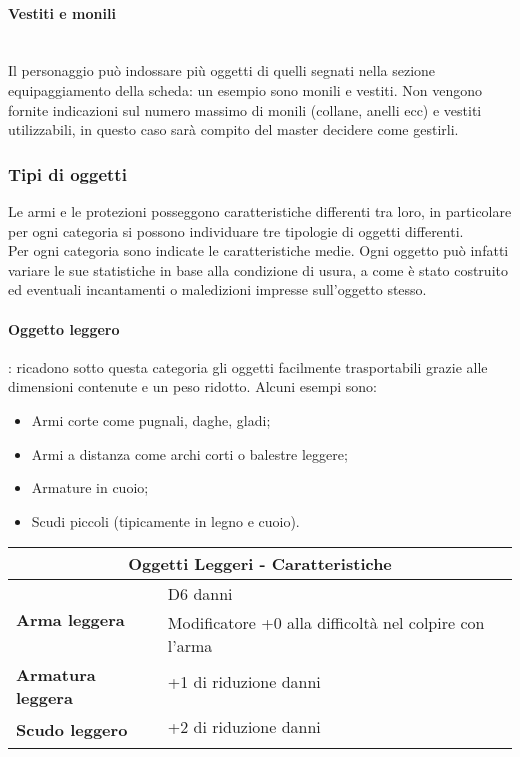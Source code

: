 \documentclass[../manuale_main.tex]{subfiles}
\begin{document}
\paragraph{Vestiti e monili}\mbox{}\\
Il personaggio può indossare più oggetti di quelli segnati nella sezione equipaggiamento della scheda: un esempio sono monili e vestiti.
Non vengono fornite indicazioni sul numero massimo di monili (collane, anelli ecc) e vestiti utilizzabili, in questo caso sarà compito del master decidere come gestirli.


\subsubsection{Tipi di oggetti}
Le armi e le protezioni posseggono caratteristiche differenti tra loro, in particolare per ogni categoria si possono individuare tre tipologie di oggetti differenti.\\
Per ogni categoria sono indicate le caratteristiche medie. Ogni oggetto può infatti variare le sue statistiche in base alla condizione di usura, a come è stato costruito ed eventuali incantamenti o maledizioni impresse sull'oggetto stesso.

\paragraph{Oggetto leggero}: ricadono sotto questa categoria gli oggetti facilmente trasportabili grazie alle dimensioni contenute e un peso ridotto. Alcuni esempi sono:
\begin{itemize}
\item Armi corte come pugnali, daghe, gladi;
\item Armi a distanza come archi corti o balestre leggere;
\item Armature in cuoio;
\item Scudi piccoli (tipicamente in legno e cuoio).
\end{itemize}

\renewcommand{\arraystretch}{1.2}
\begin{tabular}{|l l| }
\hline
\multicolumn{2}{|c|}{\textbf{Oggetti Leggeri - Caratteristiche}}\\
\hline
\hline
\multirow{2}{8em}{\textbf{Arma leggera}}&D6 danni \\&Modificatore +0 alla difficoltà nel colpire con l'arma\\
\hline
\multirow{2}{8em}{\textbf{Armatura leggera}}&+1 di riduzione danni\\&\\
\hline
\multirow{2}{8em}{\textbf{Scudo leggero}}&+2 di riduzione danni\\&\\
\hline
\end{tabular}
\mbox{}\\
\end{document}
